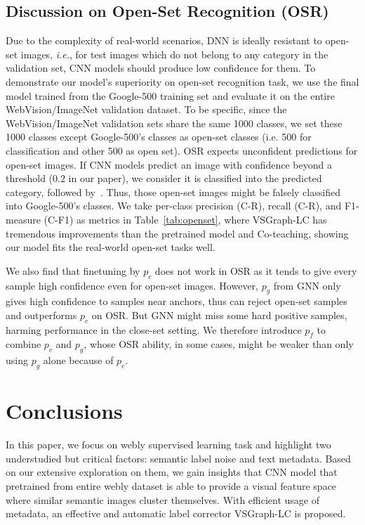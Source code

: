\documentclass[sigconf]{acmart}
\begin{document}
\subsection{Discussion on Open-Set Recognition (OSR)}
\label{S:openset}
Due to the complexity of real-world scenarios, DNN is ideally resistant to open-set images, \textit{i.e.}, for test images which do not belong to any category in the validation set, CNN models should produce low confidence for them.
To demonstrate our model's superiority on open-set recognition task, we use the final model trained from the Google-500 training set and evaluate it on the entire WebVision/ImageNet validation dataset. 
To be specific, since the WebVision/ImageNet validation sets share the same 1000 classes, we set these 1000 classes except Google-500's classes as open-set classes (i.e. 500 for classification and other 500 as open set). 
OSR expects unconfident predictions for open-set images. 
If CNN models predict an image with confidence beyond a threshold ($0.2$ in our paper), we consider it is classified into the predicted category, followed by~\cite{perera2019ocgan,yoshihashi2019classification}. 
Thus, those open-set images might be falsely classified into Google-500's classes. 
We take per-class precision (C-R), recall (C-R), and F1-measure (C-F1) as metrics in Table~\ref{tab:openset}, where VSGraph-LC has tremendous improvements than the pretrained model and Co-teaching, showing our model fits the real-world open-set tasks well.

We also find that finetuning by $p_c$ does not work in OSR as it tends to give every sample high confidence even for open-set images.
However, $p_g$ from GNN only gives high confidence to samples near anchors, thus can reject open-set samples and outperforms $p_c$ on OSR. But GNN might miss some hard positive samples, harming performance in the close-set setting. We therefore introduce $p_f$ to combine $p_c$ and $p_g$, whose OSR ability, in some cases, might be weaker than only using $p_g$ alone because of $p_c$.
    
\section{Conclusions}
In this paper, we focus on webly supervised learning task and highlight two understudied but critical factors: semantic label noise and text metadata.
Based on our extensive exploration on them, we gain insights that CNN model that pretrained from entire webly dataset is able to provide a visual feature space where similar semantic images cluster themselves. With efficient usage of metadata, an effective and automatic label corrector VSGraph-LC is proposed.
\end{document}

